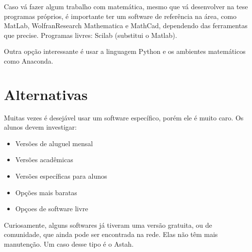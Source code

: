 Caso vá fazer algum trabalho com matemática, mesmo que vá desenvolver na tese programas próprios, é importante ter um software de referência na área, como MatLab, WolfranResearch Mathematica e MathCad, dependendo das ferramentas que precise.
Programas livres: Scilab (substitui o Matlab). 

Outra opção interessante é usar a linguagem Python e os ambientes matemáticos como Anaconda.

\section{Alternativas}

Muitas vezes é desejável usar um software específico, porém ele é muito caro. Os alunos devem investigar:

\begin{itemize}
    \item Versões de aluguel mensal
    \item Versões acadêmicas
    \item Versões específicas para alunos
    \item Opções mais baratas
    \item Opçoes de software livre
\end{itemize}

Curiosamente, alguns softwares já tiveram uma versão gratuita, ou de comunidade, que ainda pode ser encontrada na rede. Elas não têm mais manutenção. Um caso desse tipo é o Astah. 


